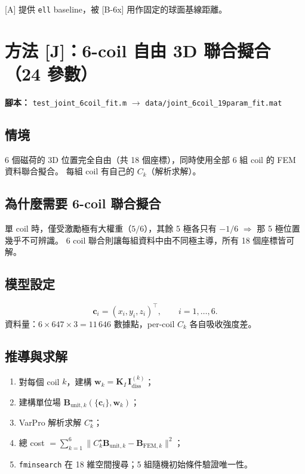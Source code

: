 \documentclass[11pt,a4paper]{article}
\newcommand{\KI}{\mathbf{K}_I}
\newcommand{\Idiss}{\mathbf{I}_{\mathrm{diss}}}
\newcommand{\bvec}{\mathbf{B}}
\newcommand{\cvec}{\mathbf{c}}
\begin{document}
[A] 提供 \texttt{ell} baseline，被 [B-6x] 用作固定的球面基線距離。

\section{方法 [J]：6-coil 自由 3D 聯合擬合（24 參數）}

\textbf{腳本：} \texttt{test\_joint\_6coil\_fit.m} \(\rightarrow\) \texttt{data/joint\_6coil\_19param\_fit.mat}

\subsection{情境}

6 個磁荷的 3D 位置完全自由（共 18 個座標），同時使用全部 6 組 coil 的 FEM 資料聯合擬合。
每組 coil 有自己的 \(C_k\)（解析求解）。

\subsection{為什麼需要 6-coil 聯合擬合}

單 coil 時，僅受激勵極有大權重（\(5/6\)），其餘 5 極各只有 \(-1/6\) \(\Rightarrow\) 那 5 極位置幾乎不可辨識。
6 coil 聯合則讓每組資料中由不同極主導，所有 18 個座標皆可解。

\subsection{模型設定}

\begin{equation}
\cvec_i = (x_i, y_i, z_i)^\top, \qquad i = 1, \dots, 6.
\end{equation}
資料量：\(6 \times 647 \times 3 = 11\,646\) 數據點，per-coil \(C_k\) 各自吸收強度差。

\subsection{推導與求解}

\begin{enumerate}[leftmargin=*]
\item 對每個 coil \(k\)，建構 \(\mathbf{w}_k = \KI \, \Idiss^{(k)}\)；
\item 建構單位場 \(\bvec_{\text{unit},k}(\{\cvec_i\}, \mathbf{w}_k)\)；
\item VarPro 解析求解 \(C_k^\star\)；
\item 總 cost \(= \sum_{k=1}^{6} \|C_k^\star \bvec_{\text{unit},k} - \bvec_{\text{FEM},k}\|^2\)；
\item \texttt{fminsearch} 在 18 維空間搜尋；5 組隨機初始條件驗證唯一性。
\end{enumerate}
\end{document}
